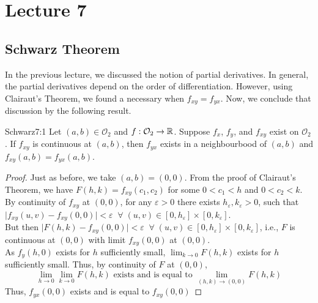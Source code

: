 \documentclass[../Analysis-3.tex]{subfiles}
\begin{document}
\chapter*{Lecture 7} %
\setcounter{chapter}{7} %
\setcounter{section}{0}



\section{Schwarz Theorem}

In the previous lecture, we discussed the notion of partial derivatives. In general, the partial derivatives depend on the order of differentiation. However, using Clairaut's Theorem, we found a necessary when $f_{xy} = f_{yx}$. Now, we conclude that discussion by the following result.

\begin{Thm}{Schwarz}{7:1}
  Let $(a,b) \in \mathcal{O}_2$ and $f:\mathcal{O}_2 \to \mathbb{R}$. Suppose $f_x$, $f_y$, and $f_{xy}$ exist on $\mathcal{O}_2$. If $f_{xy}$ is continuous at $(a,b)$, then $f_{yx}$ exists in a neighbourbood of $(a,b)$ and $f_{xy}(a,b) = f_{yx}(a,b)$.
\end{Thm}

\begin{proof}
  Just as before, we take $(a,b) = (0,0)$. From the proof of Clairaut's Theorem, we have $F(h,k) = f_{xy}(c_1, c_2)$ for some $0 < c_1< h$ and $0 < c_2 < k$. By continuity of $f_{xy}$ at $(0,0)$, for any $\varepsilon >0$ there exists $h_\varepsilon, k_\varepsilon > 0$, such that $\mid f_{xy}(u,v)- f_{xy}(0,0)\mid < \varepsilon \;\;\forall \; (u,v) \in [0,h_\varepsilon]\times[0,k_\varepsilon]$. \\
  But then $\mid F(h,k) - f_{xy}(0,0) \mid < \varepsilon \;\;\forall \; (u,v) \in [0,h_\varepsilon]\times[0,k_\varepsilon]$, i.e., $F$ is continuous at $(0,0)$ with limit $f_{xy}(0,0)$ at $(0,0)$.\\
  As $f_y(h,0)$ exists for $h$ sufficiently small, $\lim_{k \to 0} F(h,k)$ exists for $h$ sufficiently small. Thus, by continuity of $F$ at $(0,0)$,
  \[\lim_{h \to 0}\lim_{k \to 0} F(h,k) \text{  exists and is equal to  }\lim_{(h,k) \to (0,0)} F(h,k)\]
  Thus, $f_{yx}(0,0)$ exists and is equal to $f_{xy}(0,0)$
\end{proof}

\vspace{.2 cm}
\end{document}
